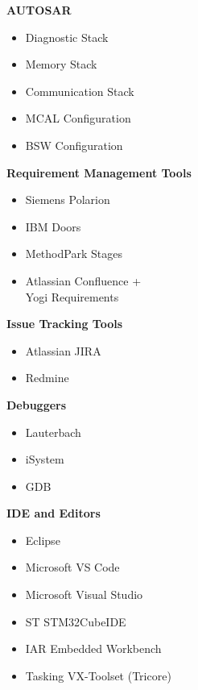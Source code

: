 \begin{minipage}[t]{0.48\textwidth}
\vspace{0.5em}

\textbf{AUTOSAR}
\begin{itemize}[leftmargin=*,noitemsep,topsep=0pt]
    \item Diagnostic Stack 
    \item Memory Stack 
    \item Communication Stack 
    \item MCAL Configuration 
    \item BSW Configuration 
\end{itemize}

\vspace{0.5em}

\textbf{Requirement Management Tools}
\begin{itemize}[leftmargin=*,noitemsep,topsep=0pt]
    \item Siemens Polarion 
    \item IBM Doors 
    \item MethodPark Stages 
    \item Atlassian Confluence + \\Yogi Requirements 
\end{itemize}

\vspace{0.5em}

\textbf{Issue Tracking Tools}
\begin{itemize}[leftmargin=*,noitemsep,topsep=0pt]
    \item Atlassian JIRA 
    \item Redmine 
\end{itemize}

\vspace{0.5em}

\textbf{Debuggers}
\begin{itemize}[leftmargin=*,noitemsep,topsep=0pt]
    \item Lauterbach 
    \item iSystem 
    \item GDB 
\end{itemize}

\vspace{0.5em}

\textbf{IDE and Editors}
\begin{itemize}[leftmargin=*,noitemsep,topsep=0pt]
    \item Eclipse 
    \item Microsoft VS Code 
    \item Microsoft Visual Studio 
    \item ST STM32CubeIDE 
    \item IAR Embedded Workbench 
    \item Tasking VX-Toolset (Tricore) 
\end{itemize}
\end{minipage}
